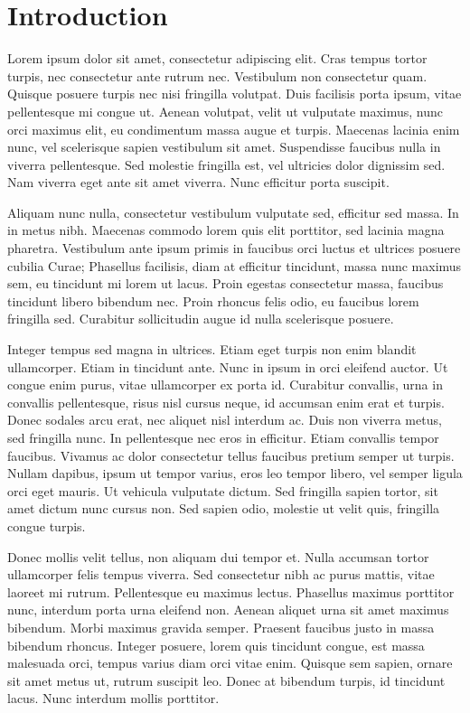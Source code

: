\section{Introduction}
Lorem ipsum dolor sit amet, consectetur adipiscing elit. Cras tempus tortor turpis, nec consectetur ante rutrum nec. Vestibulum non consectetur quam. Quisque posuere turpis nec nisi fringilla volutpat. Duis facilisis porta ipsum, vitae pellentesque mi congue ut. Aenean volutpat, velit ut vulputate maximus, nunc orci maximus elit, eu condimentum massa augue et turpis. Maecenas lacinia enim nunc, vel scelerisque sapien vestibulum sit amet. Suspendisse faucibus nulla in viverra pellentesque. Sed molestie fringilla est, vel ultricies dolor dignissim sed. Nam viverra eget ante sit amet viverra. Nunc efficitur porta suscipit.

Aliquam nunc nulla, consectetur vestibulum vulputate sed, efficitur sed massa. In in metus nibh. Maecenas commodo lorem quis elit porttitor, sed lacinia magna pharetra. Vestibulum ante ipsum primis in faucibus orci luctus et ultrices posuere cubilia Curae; Phasellus facilisis, diam at efficitur tincidunt, massa nunc maximus sem, eu tincidunt mi lorem ut lacus. Proin egestas consectetur massa, faucibus tincidunt libero bibendum nec. Proin rhoncus felis odio, eu faucibus lorem fringilla sed. Curabitur sollicitudin augue id nulla scelerisque posuere.

Integer tempus sed magna in ultrices. Etiam eget turpis non enim blandit ullamcorper. Etiam in tincidunt ante. Nunc in ipsum in orci eleifend auctor. Ut congue enim purus, vitae ullamcorper ex porta id. Curabitur convallis, urna in convallis pellentesque, risus nisl cursus neque, id accumsan enim erat et turpis. Donec sodales arcu erat, nec aliquet nisl interdum ac. Duis non viverra metus, sed fringilla nunc. In pellentesque nec eros in efficitur. Etiam convallis tempor faucibus. Vivamus ac dolor consectetur tellus faucibus pretium semper ut turpis. Nullam dapibus, ipsum ut tempor varius, eros leo tempor libero, vel semper ligula orci eget mauris. Ut vehicula vulputate dictum. Sed fringilla sapien tortor, sit amet dictum nunc cursus non. Sed sapien odio, molestie ut velit quis, fringilla congue turpis.

Donec mollis velit tellus, non aliquam dui tempor et. Nulla accumsan tortor ullamcorper felis tempus viverra. Sed consectetur nibh ac purus mattis, vitae laoreet mi rutrum. Pellentesque eu maximus lectus. Phasellus maximus porttitor nunc, interdum porta urna eleifend non. Aenean aliquet urna sit amet maximus bibendum. Morbi maximus gravida semper. Praesent faucibus justo in massa bibendum rhoncus. Integer posuere, lorem quis tincidunt congue, est massa malesuada orci, tempus varius diam orci vitae enim. Quisque sem sapien, ornare sit amet metus ut, rutrum suscipit leo. Donec at bibendum turpis, id tincidunt lacus. Nunc interdum mollis porttitor.

